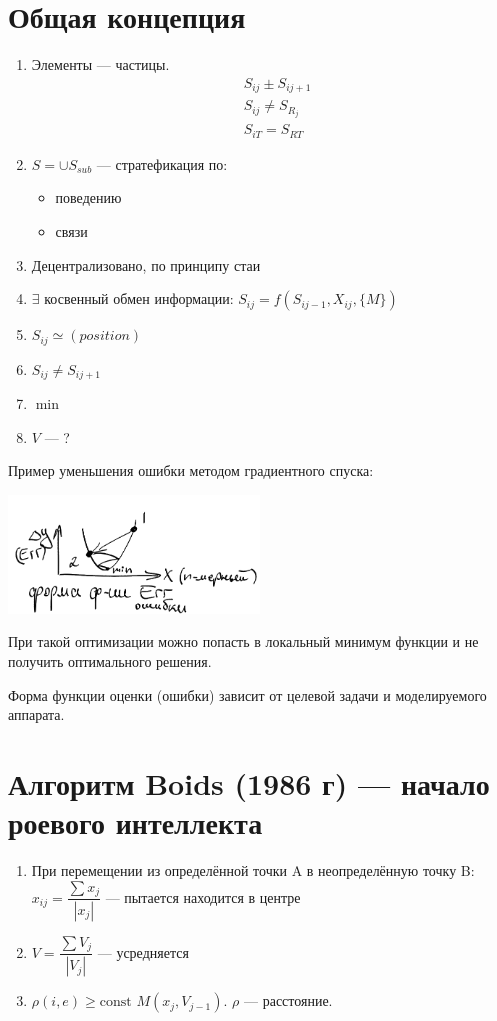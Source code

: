 \documentclass[12pt]{article}
\begin{document}
\section{Общая концепция}
\begin{enumerate}
    \item Элементы — частицы.
          \begin{align*}
               & S_{ij} \pm S_{ij+1} \\
               & S_{ij} \neq S_{R_j} \\
               & S_{iT} = S_{RT}
          \end{align*}
    \item $S = \cup S_{sub}$ — стратефикация по:
          \begin{itemize}
              \item поведению
              \item связи
          \end{itemize}
    \item Децентрализовано, по принципу стаи
    \item $\exists$ косвенный обмен информации: $S_{ij} = f(S_{ij-1}, X_{ij}, \{M\})$
    \item $S_{ij} \simeq (position)$
    \item $S_{ij} \neq S_{ij+1}$
    \item $\min$
    \item $V$ — ?
\end{enumerate}

Пример уменьшения ошибки методом градиентного спуска:

\includegraphics[width=0.5\textwidth]{graphics/pic03.png}

При такой оптимизации можно попасть в локальный минимум функции и не получить оптимального решения.

Форма функции оценки (ошибки) зависит от целевой задачи и моделируемого аппарата.

\section{Алгоритм Boids (1986 г) — начало роевого интеллекта}
\begin{enumerate}
    \item При перемещении из определённой точки A в неопределённую точку B: \\
          $x_{ij} = \dfrac{\sum{x_j}}{|x_j|}$ — пытается находится в центре
    \item $V = \dfrac{\sum V_j}{|V_j|}$ — усредняется
    \item $\rho(i, e) \geq \text{const}$ $M(x_j, V_{j - 1})$. $\rho$ — расстояние.
\end{enumerate}
\end{document}
